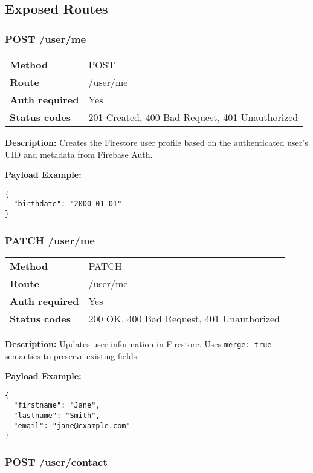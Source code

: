 \subsection*{Exposed Routes}

\subsubsection*{POST /user/me}

\begin{tabular}{>{\bfseries}l l}
\toprule
Method & POST \\
Route & /user/me \\
Auth required & Yes \\
Status codes & 201 Created, 400 Bad Request, 401 Unauthorized \\
\bottomrule
\end{tabular}

\textbf{Description:} Creates the Firestore user profile based on the authenticated user's UID and metadata from Firebase Auth.

\vspace{1em}
\textbf{Payload Example:}
\begin{verbatim}
{
  "birthdate": "2000-01-01"
}
\end{verbatim}

\subsubsection*{PATCH /user/me}

\begin{tabular}{>{\bfseries}l l}
\toprule
Method & PATCH \\
Route & /user/me \\
Auth required & Yes \\
Status codes & 200 OK, 400 Bad Request, 401 Unauthorized \\
\bottomrule
\end{tabular}

\textbf{Description:} Updates user information in Firestore. Uses \texttt{merge: true} semantics to preserve existing fields.

\vspace{1em}
\textbf{Payload Example:}
\begin{verbatim}
{
  "firstname": "Jane",
  "lastname": "Smith",
  "email": "jane@example.com"
}
\end{verbatim}

\subsubsection*{POST /user/contact}

